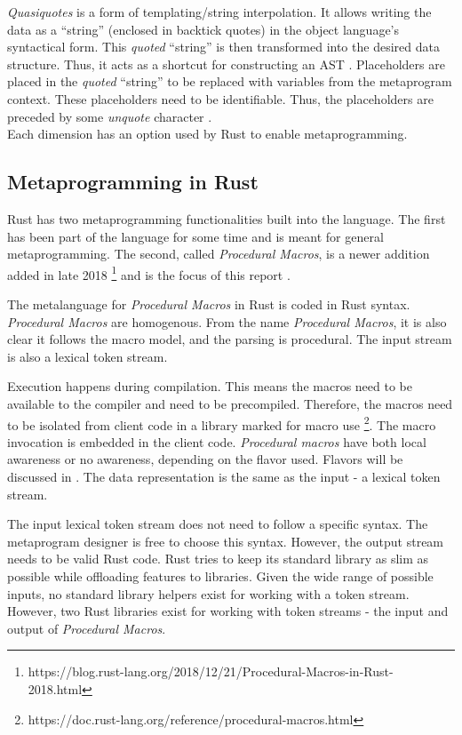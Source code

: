 \textit{Quasiquotes} is a form of templating/string interpolation.
It allows writing the data as a ``string'' (enclosed in backtick quotes) in the object language's syntactical form.
This \textit{quoted} ``string'' is then transformed into the desired data structure.
Thus, it acts as a shortcut for constructing an AST \cite{lilis_15_01}.
Placeholders are placed in the \textit{quoted} ``string'' to be replaced with variables from the metaprogram context.
These placeholders need to be identifiable.
Thus, the placeholders are preceded by some \textit{unquote} character \cite{bawden_99_01}.\\

Each dimension has an option used by Rust to enable metaprogramming.

\subsection{Metaprogramming in Rust}
\label{sec:rust-metaprogramming}
Rust has two metaprogramming functionalities built into the language.
The first has been part of the language for some time and is meant for general metaprogramming.
The second, called \textit{Procedural Macros}, is a newer addition added in late 2018 \footnote{https://blog.rust-lang.org/2018/12/21/Procedural-Macros-in-Rust-2018.html} and is the focus of this report \cite{klabnik_2019_01}.

The metalanguage for \textit{Procedural Macros} in Rust is coded in Rust syntax.
\textit{Procedural Macros} are homogenous.
From the name \textit{Procedural Macros}, it is also clear it follows the macro model, and the parsing is procedural.
The input stream is also a lexical token stream.

Execution happens during compilation.
This means the macros need to be available to the compiler and need to be precompiled.
Therefore, the macros need to be isolated from client code in a library marked for macro use \footnote{https://doc.rust-lang.org/reference/procedural-macros.html}.
The macro invocation is embedded in the client code.
\textit{Procedural macros} have both local awareness or no awareness, depending on the flavor used.
Flavors will be discussed in .
The data representation is the same as the input - a lexical token stream.

The input lexical token stream does not need to follow a specific syntax.
The metaprogram designer is free to choose this syntax.
However, the output stream needs to be valid Rust code.
Rust tries to keep its standard library as slim as possible while offloading features to libraries.
Given the wide range of possible inputs, no standard library helpers exist for working with a token stream.
However, two Rust libraries exist for working with token streams - the input and output of \textit{Procedural Macros}.

